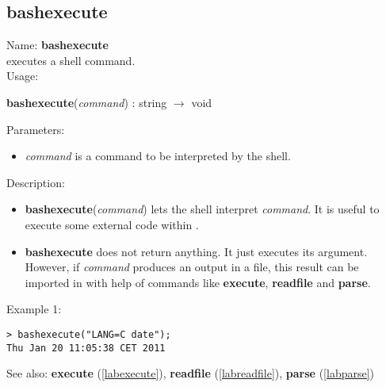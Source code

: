 \subsection{bashexecute}
\label{labbashexecute}
\noindent Name: \textbf{bashexecute}\\
executes a shell command.\\
\noindent Usage: 
\begin{center}
\textbf{bashexecute}(\emph{command}) : \textsf{string} $\rightarrow$ \textsf{void}\\
\end{center}
Parameters: 
\begin{itemize}
\item \emph{command} is a command to be interpreted by the shell.
\end{itemize}
\noindent Description: \begin{itemize}

\item \textbf{bashexecute}(\emph{command}) lets the shell interpret \emph{command}. It is useful to execute
   some external code within \sollya.

\item \textbf{bashexecute} does not return anything. It just executes its argument. However, if
   \emph{command} produces an output in a file, this result can be imported in \sollya
   with help of commands like \textbf{execute}, \textbf{readfile} and \textbf{parse}.
\end{itemize}
\noindent Example 1: 
\begin{center}\begin{minipage}{15cm}\begin{Verbatim}[frame=single]
> bashexecute("LANG=C date");
Thu Jan 20 11:05:38 CET 2011
\end{Verbatim}
\end{minipage}\end{center}
See also: \textbf{execute} (\ref{labexecute}), \textbf{readfile} (\ref{labreadfile}), \textbf{parse} (\ref{labparse})
